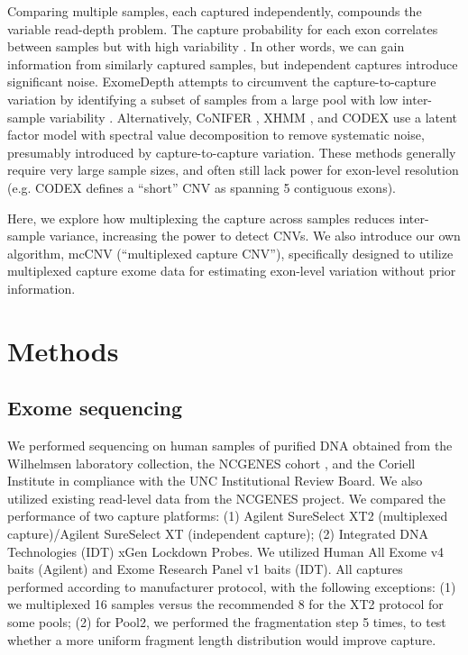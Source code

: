 \documentclass{article}\usepackage[]{graphicx}\usepackage[]{color}
\begin{document}
Comparing multiple samples, each captured independently, compounds the variable read-depth problem.
The capture probability for each exon correlates between samples but with high variability \cite{plagnol:2012aa}.
In other words, we can gain information from similarly captured samples, but independent captures introduce significant noise.
ExomeDepth attempts to circumvent the capture-to-capture variation by identifying a subset of samples from a large pool with low inter-sample variability \cite{plagnol:2012aa}.
Alternatively, CoNIFER \cite{krumm:2012aa}, XHMM \cite{fromer:2012aa}, and CODEX \cite{jiang:2015aa} use a latent factor model with spectral value decomposition to remove systematic noise, presumably introduced by capture-to-capture variation.
These methods generally require very large sample sizes, and often still lack power for exon-level resolution (e.g. CODEX defines a ``short'' CNV as spanning 5 contiguous exons).

Here, we explore how multiplexing the capture across samples reduces inter-sample variance, increasing the power to detect CNVs.
We also introduce our own algorithm, mcCNV (``multiplexed capture CNV''), specifically designed to utilize multiplexed capture exome data for estimating exon-level variation without prior information.


\section{Methods}

\subsection{Exome sequencing}

We performed sequencing on human samples of purified DNA obtained from the Wilhelmsen laboratory collection, the NCGENES cohort \cite{foreman:2013aa}, and the Coriell Institute in compliance with the UNC Institutional Review Board.
We also utilized existing read-level data from the NCGENES \cite{foreman:2013aa} project.
We compared the performance of two capture platforms: (1) Agilent SureSelect XT2 (multiplexed capture)/Agilent SureSelect XT (independent capture); (2) Integrated DNA Technologies (IDT) xGen Lockdown Probes.
We utilized Human All Exome v4 baits (Agilent) and Exome Research Panel v1 baits (IDT).
All captures performed according to manufacturer protocol, with the following exceptions: (1) we multiplexed 16 samples versus the recommended 8 for the XT2 protocol for some pools; (2) for Pool2, we performed the fragmentation step 5 times, to test whether a more uniform fragment length distribution would improve capture.
\end{document}

